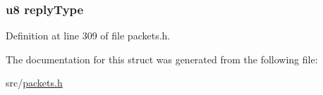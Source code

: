 \hypertarget{struct_v_m___r_e_p_l_y_a22d54946f3de285a0602996eeab97bb2}{}
\subsubsection[{reply\+Type}]{ {\bf u8} reply\+Type}\label{struct_v_m___r_e_p_l_y_a22d54946f3de285a0602996eeab97bb2}


Definition at line 309 of file packets.\+h.



The documentation for this struct was generated from the following file\+:\begin{DoxyCompactItemize}
\item 
src/\hyperlink{packets_8h}{packets.\+h}\end{DoxyCompactItemize}
